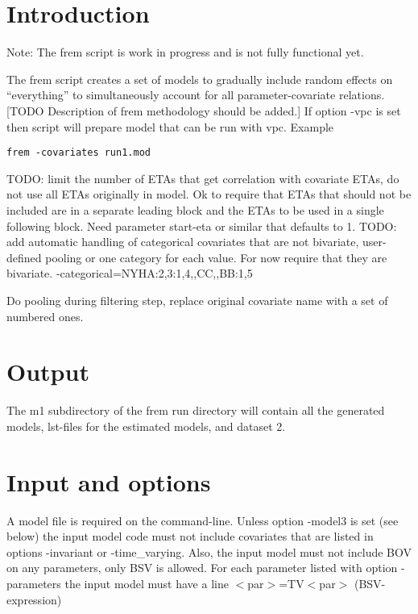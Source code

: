 



\maketitle


\section{Introduction}
Note: The frem script is work in progress and is not fully functional yet.

The frem script creates a set of models to gradually include random effects on “everything” to simultaneously account for all parameter-covariate relations. [TODO Description of frem methodology should be added.] If option -vpc is set then script will prepare model that can be run with vpc.
Example
\begin{verbatim}
frem -covariates run1.mod
\end{verbatim}


TODO: limit the number of ETAs that get correlation with covariate ETAs, do not use all ETAs originally in model. Ok to require that ETAs that should not be included are in a separate leading block and the ETAs to be used in a single following block. Need parameter start-eta or similar that defaults to 1.
TODO: add automatic handling of categorical covariates that are not bivariate, user-defined pooling or one category for each value. For now require that they are bivariate.
 -categorical=NYHA:2,3:1,4,,CC,,BB:1,5

Do pooling during filtering step, replace original covariate name with a set of numbered ones. 


\section{Output}
The m1 subdirectory of the frem run directory will contain all the generated models, lst-files for the estimated models, and dataset 2.

\section{Input and options}
A model file is required on the command-line. Unless option -model3 is set (see below) the input model code must not include covariates that are listed in options -invariant or -time\_varying. Also, the input model must not include  BOV on any parameters, only BSV is allowed. For each parameter listed with option -parameters the input model must have a line 
$<$par$>$=TV$<$par$>$ (BSV-expression)

